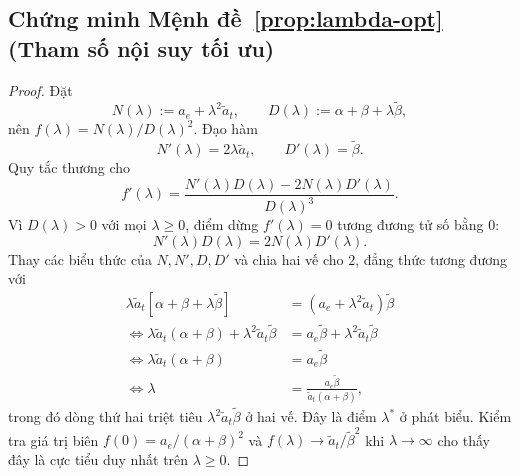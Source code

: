 \subsection*{Chứng minh Mệnh đề~\ref{prop:lambda-opt} (Tham số nội suy tối ưu)}

\begin{proof}
Đặt
\[
    N(\lambda) := a_e + \lambda^2 \tilde a_t, \qquad D(\lambda) := \alpha + \beta + \lambda \tilde\beta,
\]
nên $f(\lambda) = N(\lambda) / D(\lambda)^2$. Đạo hàm
\[
    N'(\lambda) = 2 \lambda \tilde a_t, \qquad D'(\lambda) = \tilde\beta.
\]
Quy tắc thương cho
\[
    f'(\lambda) = \frac{N'(\lambda) D(\lambda) - 2 N(\lambda) D'(\lambda)}{D(\lambda)^3}.
\]
Vì $D(\lambda) > 0$ với mọi $\lambda \geq 0$, điểm dừng $f'(\lambda) = 0$ tương đương tử số bằng $0$:
\[
    N'(\lambda) D(\lambda) = 2 N(\lambda) D'(\lambda).
\]
Thay các biểu thức của $N, N', D, D'$ và chia hai vế cho $2$, đẳng thức tương đương với
\begin{align*}
    \lambda \tilde a_t \left[\alpha + \beta + \lambda \tilde\beta\right] &= (a_e + \lambda^2 \tilde a_t) \tilde\beta \\
    \iff \lambda \tilde a_t (\alpha + \beta) + \lambda^2 \tilde a_t \tilde\beta &= a_e \tilde\beta + \lambda^2 \tilde a_t \tilde\beta \\
    \iff \lambda \tilde a_t (\alpha + \beta) &= a_e \tilde\beta \\
    \iff \lambda &= \frac{a_e \tilde\beta}{\tilde a_t (\alpha + \beta)},
\end{align*}
trong đó dòng thứ hai triệt tiêu $\lambda^2 \tilde a_t \tilde\beta$ ở hai vế. Đây là điểm $\lambda^*$ ở phát biểu. Kiểm tra giá trị biên $f(0) = a_e/(\alpha + \beta)^2$ và $f(\lambda) \to \tilde a_t/\tilde\beta^2$ khi $\lambda \to \infty$ cho thấy đây là cực tiểu duy nhất trên $\lambda \geq 0$.
\end{proof}

